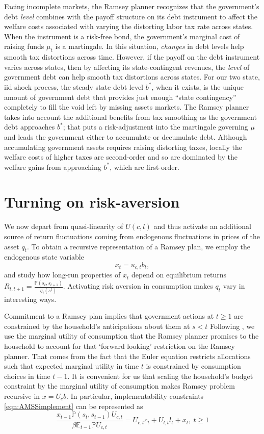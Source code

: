 \documentclass[12pt]{article}
\newcommand{\EE}{\mathbb E}
\begin{document}
	  Facing incomplete markets, the  Ramsey planner recognizes that   the government's debt {\em level} combines with  the
 payoff structure on its debt instrument to affect  the welfare costs associated with varying the distorting labor tax rate across states.  When the
  instrument is a risk-free bond, the government's marginal cost of raising funds $\mu_t$ is  a martingale. In this situation,
    {\em changes} in debt levels  help smooth tax distortions across time. 		
	However, if the  payoff on the debt instrument varies across states, then  by affecting its state-contingent revenues, the {\em level} of government debt can help smooth tax distortions across states.
	For our two state, iid shock process,  the steady state debt level $b^*$, when it exists, is the unique amount of government debt
that provides just enough ``state contingency'' completely to fill the void left by  missing assets markets.  The Ramsey planner takes into account the additional benefits from tax smoothing as the government debt approaches $b^*$;  that puts a risk-adjustment into the martingale governing $\mu$ and leads the
 government either to accumulate or decumulate debt.	
	 Although accumulating government assets requires  raising distorting  taxes, locally  the welfare costs of higher taxes are second-order and
so are  dominated by the welfare gains from approaching  $b^*$, which are first-order.



\section{Turning on risk-aversion}

  We now depart from quasi-linearity of $U(c,l)$ and thus activate an additional source of return fluctuations coming from endogenous fluctuations in prices of the asset $q_t$.  To obtain a recursive representation of a Ramsey plan,
  we employ the endogenous state variable
  \[x_t=u_{c,t}b_{t} ,\]
  and study how long-run properties of $x_t$ depend on equilibrium returns $R_{t,t+1}=\frac{\mathbb{P}(s_t,s_{t+1})}{q_t(s^t)}$.
   Activating risk aversion in consumption makes $q_t$ vary in interesting ways.

  Commitment to a Ramsey plan implies that government actions at $t \geq 1$ are constrained by the household's anticipations about them at $s < t$
	 Following \citet{Kydland1980}, we  use the  marginal utility of consumption that the
Ramsey planner promises to the household to account for that `forward looking' restriction on the Ramsey planner. That
comes from the fact that the Euler equation restricts allocations such that expected marginal utility in time $t$ is constrained by consumption choices
in time $t-1$.  It is convenient for us that scaling the household's  budget constraint by the  marginal utility
 of consumption makes Ramsey problem  recursive in  $x=U_c b$.  In particular, implementability constraints \eqref{eqn:AMSSimplement}
 can be represented as
		\begin{equation}
		\frac{x_{t-1} \mathbb{P}(s_t,s_{t-1}) U_{c,t}}{\beta \EE_{t-1} \mathbb{P}U_{c,t}}  = U_{c,t}c_t+U_{l,t} l_t + x_t, \ t \geq 1
	\end{equation}
\end{document}

